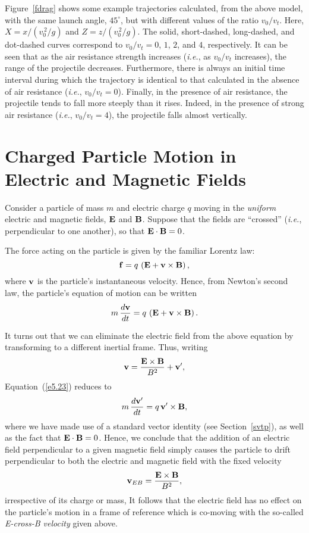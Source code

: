 Figure~\ref{fdrag} shows some example trajectories calculated, from the above model, with the same launch
angle, $45^\circ$, but with different values of the ratio $v_0/v_t$. Here,
$X=x/(v_0^{\,2}/g)$ and $Z=z/(v_0^{\,2}/g)$. The solid, short-dashed,
long-dashed, and dot-dashed curves correspond to $v_0/v_t = 0$, $1$, $2$,
and $4$, respectively. It can be seen that as the air resistance strength
increases  ({\em i.e.}, as $v_0/v_t$ increases), the range of the
projectile decreases.  Furthermore, there is always an initial time interval
during which the trajectory is identical to that calculated in the absence
of air resistance ({\em i.e.}, $v_0/v_t=0$). Finally, in the presence of
air resistance, the projectile tends to fall more steeply than it rises.
Indeed, in the presence of strong air resistance ({\em i.e.}, $v_0/v_t=4$), the projectile falls almost
vertically.

\section{Charged Particle Motion in  Electric and Magnetic Fields}
Consider a particle of mass $m$ and electric charge $q$ moving
in the {\em uniform}\/ electric and magnetic fields, ${\bf E}$ and ${\bf B}$. 
Suppose that the fields are ``crossed'' ({\em i.e.}, perpendicular to
one another), so that ${\bf E}\cdot{\bf B} = 0$. 

The force acting on the particle is given by the familiar Lorentz law:
\begin{equation}
{\bf f} = q\,\left({\bf E} + {\bf v}\times{\bf B}\right),
\end{equation}
where ${\bf v}$ is the particle's instantaneous velocity. Hence, from
Newton's second law, the particle's equation of motion can be written
\begin{equation}\label{e5.23}
m\,\frac{d{\bf v}}{dt} = q\,\left({\bf E} + {\bf v}\times{\bf B}\right).
\end{equation}

It turns out that we can eliminate the electric field from the above equation by
transforming to a different inertial frame. Thus, writing
\begin{equation}
{\bf v} = \frac{{\bf E}\times{\bf B}}{B^2} + {\bf v}',
\end{equation}
Equation~(\ref{e5.23}) reduces to
\begin{equation}\label{e5.24}
m\,\frac{d{\bf v}'}{dt} = q\,{\bf v}'\times{\bf B},
\end{equation}
where we have made use of a standard vector identity (see Section~\ref{svtp}), as well
as the fact that ${\bf E}\cdot{\bf B} = 0$.
Hence, we conclude that the addition of an electric field perpendicular to a
given magnetic field simply causes the particle to drift perpendicular to both the electric and magnetic
field with the fixed velocity
\begin{equation}\label{e5.26}
{\bf v}_{EB} = \frac{{\bf E}\times{\bf B}}{B^2},
\end{equation}
irrespective of its
charge or mass,
It follows that the electric field has no effect on the particle's
motion in  a frame of reference which is co-moving with the so-called {\em E-cross-B velocity}\/ given above.

